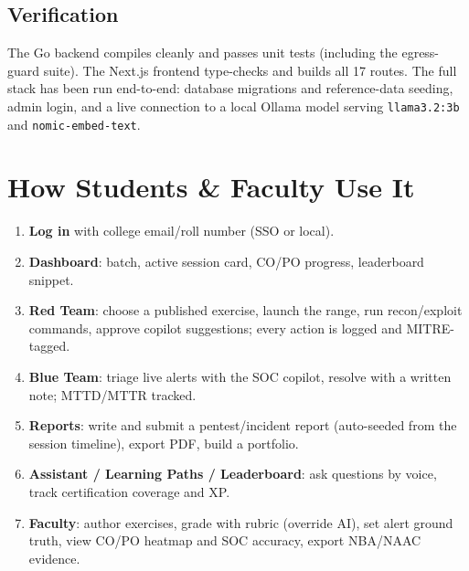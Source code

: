 \documentclass[11pt,a4paper]{article}
\begin{document}
\subsection{Verification}
The Go backend compiles cleanly and passes unit tests (including the egress-guard
suite). The Next.js frontend type-checks and builds all 17 routes. The full
stack has been run end-to-end: database migrations and reference-data seeding,
admin login, and a live connection to a local Ollama model serving
\texttt{llama3.2:3b} and \texttt{nomic-embed-text}.

\section{How Students \& Faculty Use It}
\begin{enumerate}[leftmargin=*]
  \item \textbf{Log in} with college email/roll number (SSO or local).
  \item \textbf{Dashboard}: batch, active session card, CO/PO progress, leaderboard snippet.
  \item \textbf{Red Team}: choose a published exercise, launch the range, run recon/exploit commands, approve copilot suggestions; every action is logged and MITRE-tagged.
  \item \textbf{Blue Team}: triage live alerts with the SOC copilot, resolve with a written note; MTTD/MTTR tracked.
  \item \textbf{Reports}: write and submit a pentest/incident report (auto-seeded from the session timeline), export PDF, build a portfolio.
  \item \textbf{Assistant / Learning Paths / Leaderboard}: ask questions by voice, track certification coverage and XP.
  \item \textbf{Faculty}: author exercises, grade with rubric (override AI), set alert ground truth, view CO/PO heatmap and SOC accuracy, export NBA/NAAC evidence.
\end{enumerate}

\end{document}
